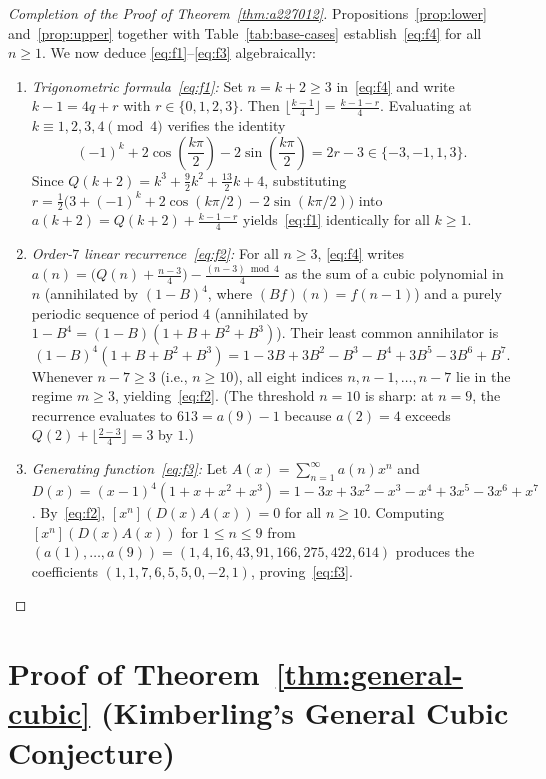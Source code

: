 \documentclass[11pt,a4paper]{article}
\theoremstyle{remark}
\begin{document}
\begin{proof}[Completion of the Proof of Theorem~\ref{thm:a227012}]
Propositions~\ref{prop:lower} and~\ref{prop:upper} together with Table~\ref{tab:base-cases} establish~\eqref{eq:f4} for all $n \ge 1$. We now deduce \eqref{eq:f1}--\eqref{eq:f3} algebraically:
\begin{enumerate}
  \item \emph{Trigonometric formula~\eqref{eq:f1}:} Set $n = k + 2 \ge 3$ in~\eqref{eq:f4} and write $k - 1 = 4q + r$ with $r \in \{0, 1, 2, 3\}$. Then $\lfloor \frac{k-1}{4} \rfloor = \frac{k - 1 - r}{4}$. Evaluating at $k \equiv 1, 2, 3, 4 \pmod 4$ verifies the identity
  \[
    (-1)^k + 2\cos\!\left(\frac{k\pi}{2}\right) - 2\sin\!\left(\frac{k\pi}{2}\right) = 2r - 3 \in \{-3, -1, 1, 3\}.
  \]
  Since $Q(k+2) = k^3 + \frac{9}{2}k^2 + \frac{13}{2}k + 4$, substituting $r = \frac{1}{2}\big(3 + (-1)^k + 2\cos(k\pi/2) - 2\sin(k\pi/2)\big)$ into $a(k+2) = Q(k+2) + \frac{k - 1 - r}{4}$ yields~\eqref{eq:f1} identically for all $k \ge 1$.

  \item \emph{Order-$7$ linear recurrence~\eqref{eq:f2}:} For all $n \ge 3$, \eqref{eq:f4} writes $a(n) = \big(Q(n) + \frac{n-3}{4}\big) - \frac{(n-3) \bmod 4}{4}$ as the sum of a cubic polynomial in $n$ (annihilated by $(1 - B)^4$, where $(Bf)(n) = f(n-1)$) and a purely periodic sequence of period $4$ (annihilated by $1 - B^4 = (1 - B)(1 + B + B^2 + B^3)$). Their least common annihilator is
  \[
    (1 - B)^4(1 + B + B^2 + B^3) = 1 - 3B + 3B^2 - B^3 - B^4 + 3B^5 - 3B^6 + B^7.
  \]
  Whenever $n - 7 \ge 3$ (i.e., $n \ge 10$), all eight indices $n, n-1, \dots, n-7$ lie in the regime $m \ge 3$, yielding~\eqref{eq:f2}. (The threshold $n = 10$ is sharp: at $n = 9$, the recurrence evaluates to $613 = a(9) - 1$ because $a(2) = 4$ exceeds $Q(2) + \lfloor \frac{2-3}{4} \rfloor = 3$ by $1$.)

  \item \emph{Generating function~\eqref{eq:f3}:} Let $A(x) = \sum_{n=1}^{\infty} a(n)x^n$ and $D(x) = (x - 1)^4(1 + x + x^2 + x^3) = 1 - 3x + 3x^2 - x^3 - x^4 + 3x^5 - 3x^6 + x^7$. By~\eqref{eq:f2}, $[x^n](D(x)A(x)) = 0$ for all $n \ge 10$. Computing $[x^n](D(x)A(x))$ for $1 \le n \le 9$ from $(a(1),\dots,a(9)) = (1,4,16,43,91,166,275,422,614)$ produces the coefficients $(1, 1, 7, 6, 5, 5, 0, -2, 1)$, proving~\eqref{eq:f3}. \qedhere
\end{enumerate}
\end{proof}

\section{Proof of Theorem~\ref{thm:general-cubic} (Kimberling's General Cubic Conjecture)}
\end{document}
